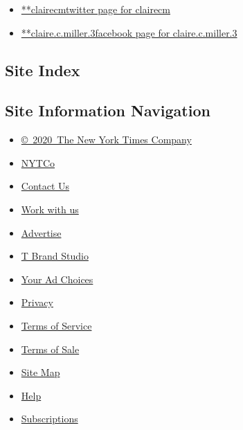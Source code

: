 \begin{itemize}
\tightlist
\item
  \href{https://twitter.com/clairecm}{**clairecmtwitter page for
  clairecm}
\item
  \href{https://www.facebook.com/claire.c.miller.3}{**claire.c.miller.3facebook
  page for claire.c.miller.3}
\end{itemize}

\hypertarget{site-index}{%
\subsection{Site Index}\label{site-index}}

\hypertarget{site-information-navigation}{%
\subsection{Site Information
Navigation}\label{site-information-navigation}}

\begin{itemize}
\tightlist
\item
  \href{https://help.nytimes.com/hc/en-us/articles/115014792127-Copyright-notice}{©~2020~The
  New York Times Company}
\end{itemize}

\begin{itemize}
\tightlist
\item
  \href{https://www.nytco.com/}{NYTCo}
\item
  \href{https://help.nytimes.com/hc/en-us/articles/115015385887-Contact-Us}{Contact
  Us}
\item
  \href{https://www.nytco.com/careers/}{Work with us}
\item
  \href{https://nytmediakit.com/}{Advertise}
\item
  \href{http://www.tbrandstudio.com/}{T Brand Studio}
\item
  \href{https://www.nytimes.com/privacy/cookie-policy\#how-do-i-manage-trackers}{Your
  Ad Choices}
\item
  \href{https://www.nytimes.com/privacy}{Privacy}
\item
  \href{https://help.nytimes.com/hc/en-us/articles/115014893428-Terms-of-service}{Terms
  of Service}
\item
  \href{https://help.nytimes.com/hc/en-us/articles/115014893968-Terms-of-sale}{Terms
  of Sale}
\item
  \href{https://spiderbites.nytimes.com}{Site Map}
\item
  \href{https://help.nytimes.com/hc/en-us}{Help}
\item
  \href{https://www.nytimes.com/subscription?campaignId=37WXW}{Subscriptions}
\end{itemize}
